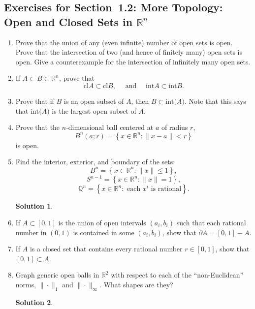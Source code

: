\documentclass[]{book}
\theoremstyle{definition}
\newtheorem*{soln}{Solution}
\newcommand{\bb}[1]{\mathbb{#1}}
\newcommand{\Q}{\bb{Q}}
\newcommand{\R}{\bb{R}}
\newcommand{\bd}{\partial}
\newcommand{\inter}[1]{\mathrm{int}{#1}}
\newcommand{\cl}[1]{\mathrm{cl}{#1}}
\newcommand{\ds}{\displaystyle}
\begin{document}
\subsection*{Exercises for Section~1.2: More Topology: Open and Closed Sets in
$\R^n$}
\begin{enumerate}
\item\label{topology}	Prove that the union of any (even infinite) number of open sets is open.
 Prove that the intersection of two (and hence of finitely many) open sets is
 open.  Give a counterexample for the intersection of infinitely many open sets.

\item\label{clAB}If $A\subset B\subset\R^n$, prove that
	$$\cl{A}\subset\cl{B},\quad\mbox{ and }\quad\inter{A}\subset\inter{B}.$$

\item	Prove that if $B$ is an open subset of $A$, then $B\subset \inter(A)$.  Note that this says that $\inter(A)$ is the largest open subset of $A$.

\item	\label{openset}Prove that the $n$-dimensional ball centered at $a$ of radius $r$,
	$$\ds B^n(a;r) = \left\{x\in\R^n:\|x-a\|< r\right\}$$ is open.

\item	Find the interior, exterior, and boundary of the sets:
	$$B^n = \left\{x\in\R^n : \|x\| \leq 1\right\},$$
	$$S^{n-1} = \left\{x\in\R^n : \|x\| = 1\right\},$$
	$$\Q^n = \left\{x\in\R^n : \mbox{ each } x^i\mbox{ is rational}\right\}.$$
\begin{soln}
\end{soln}


\item	If $A\subset[0,1]$ is the union of open intervals $(a_i,b_i)$ such that
each rational number in $(0,1)$ is contained in some $(a_i,b_i)$, show that
$\bd A = [0,1] - A$.

\item	If $A$ is a closed set that contains every rational number $r\in[0,1]$,
show that $[0,1]\subset A$.

\item	Graph generic open balls in $\R^2$ with respect to each of the ``non-Euclidean'' norms, $\|\cdot\|_1$ and $\|\cdot\|_\infty$.
What shapes are they?
\begin{soln}
\end{soln}

\end{enumerate}
\end{document}
